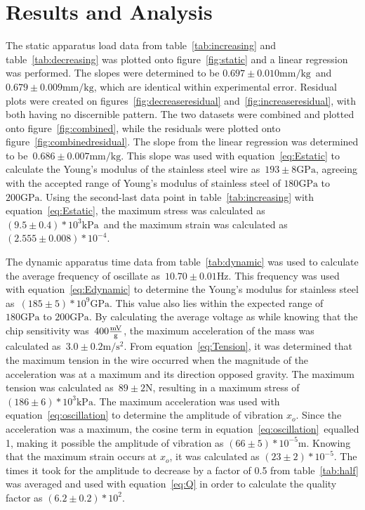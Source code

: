 \documentclass[]{article}
\newcommand{\Estatic}{\ensuremath{193 \pm 8 \si{\giga\pascal}}}
\newcommand{\slopeIncrease}{\ensuremath{0.697 \pm 0.010 \si{\milli\meter\per\kilo\gram}}}
\newcommand{\slopeDecrease}{\ensuremath{0.679 \pm 0.009 \si{\milli\meter\per\kilo\gram}}}
\newcommand{\slope}{\ensuremath{0.686 \pm 0.007 \si{\milli\meter\per\kilo\gram}}}
\newcommand{\stressMax}{\ensuremath{(9.5 \pm 0.4)*10^{3} \si{\kilo\pascal}}}
\newcommand{\strainMax}{\ensuremath{(2.555 \pm 0.008)*10^{-4}}}
\newcommand{\freq}{\ensuremath{10.70 \pm 0.01\si{\hertz}}}
\newcommand{\Edynamic}{\ensuremath{(185 \pm 5)*10^{9}\si{\giga\pascal}}}
\newcommand{\sensitivity}{\ensuremath{400\si{\frac{\milli\volt}{g}}}}
\newcommand{\acceleration}{\ensuremath{3.0 \pm 0.2\si{\meter\per\second^2}}}
\newcommand{\Tension}{\ensuremath{89 \pm 2\si{\newton}}}
\newcommand{\stressMaxDynamic}{\ensuremath{(186 \pm 6)*10^{3}\si{\kilo\pascal}}}
\newcommand{\xo}{\ensuremath{(66 \pm 5)*10^{-5}\si{\meter}}}
\newcommand{\strainMaxDynamic}{\ensuremath{(23 \pm 2)*10^{-5}}}
\newcommand{\Q}{\ensuremath{(6.2 \pm 0.2)*10^{2}}}
\begin{document}
\section{Results and Analysis}
The static apparatus load data from table~\ref{tab:increasing} and
table~\ref{tab:decreasing} was plotted onto figure~\ref{fig:static} and a linear
regression was performed.  The slopes were determined to be \slopeIncrease~and
\slopeDecrease, which are identical within experimental error. Residual plots
were created on figures~\ref{fig:decreaseresidual}
and~\ref{fig:increaseresidual}, with both having no discernible pattern. The two
datasets were combined and plotted onto figure~\ref{fig:combined}, while the
residuals were plotted onto figure~\ref{fig:combinedresidual}. The slope from
the linear regression was determined to be~\slope. This slope was used with
equation~\ref{eq:Estatic} to calculate the Young's modulus of the stainless
steel wire as~\Estatic, agreeing with the accepted range of Young's modulus of
stainless steel of $180 \si{\giga\pascal}$ to $200
\si{\giga\pascal}$\cite{ref:young}. Using the second-last data point in
table~\ref{tab:increasing} with equation~\ref{eq:Estatic}, the maximum stress
was calculated as~\stressMax~and the maximum strain was calculated
as~\strainMax.

The dynamic apparatus time data from table~\ref{tab:dynamic} was used to
calculate the average frequency of oscillate as~\freq. This frequency was used with
equation~\ref{eq:Edynamic} to determine the Young's modulus for stainless steel
as~\Edynamic. This value also lies within the expected range of $180
\si{\giga\pascal}$ to $200 \si{\giga\pascal}$\cite{ref:young}. By calculating
the average voltage as while knowing that the chip sensitivity was~\sensitivity, the
maximum acceleration of the mass was calculated as~\acceleration. From
equation~\ref{eq:Tension}, it was determined that the maximum tension in the
wire occurred when the magnitude of the acceleration was at a maximum and its
direction opposed gravity. The maximum tension was calculated as~\Tension,
resulting in a maximum stress of \stressMaxDynamic. The maximum acceleration was
used with equation~\ref{eq:oscillation} to determine the amplitude of
vibration $x_o$. Since the acceleration was a maximum, the cosine term in
equation~\ref{eq:oscillation}~equalled 1, making it possible the amplitude of
vibration as \xo.  Knowing that the maximum strain occurs at $x_o$, it was
calculated as \strainMaxDynamic. The times it took for the amplitude to decrease
by a factor of 0.5 from table~\ref{tab:half} was averaged and used with
equation~\ref{eq:Q} in order to calculate the quality factor as \Q.
\end{document}
